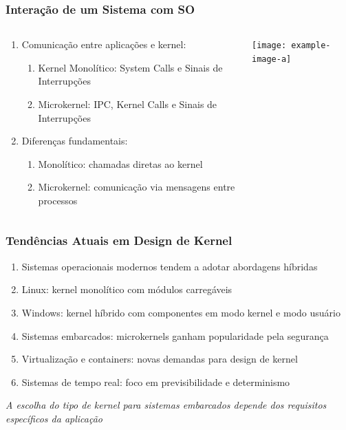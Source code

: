 \documentclass{beamer}
\begin{document}
\begin{frame}[fragile]
\frametitle{Interação de um Sistema com SO}

\begin{columns}
    \begin{column}{0.55\textwidth}
        \begin{enumerate}\small
            \item Comunicação entre aplicações e kernel:
            \begin{enumerate}\footnotesize
                \item Kernel Monolítico: System Calls e Sinais de Interrupções
                \item Microkernel: IPC, Kernel Calls e Sinais de Interrupções
            \end{enumerate}
            \item Diferenças fundamentais:
            \begin{enumerate}\footnotesize
                \item Monolítico: chamadas diretas ao kernel
                \item Microkernel: comunicação via mensagens entre processos
            \end{enumerate}
        \end{enumerate}
    \end{column}
    
    \begin{column}{0.45\textwidth}
        \begin{center}
            \texttt{[image: example-image-a]}
        \end{center}
    \end{column}
\end{columns}
\end{frame}

\begin{frame}[fragile]
\frametitle{Tendências Atuais em Design de Kernel}

\begin{enumerate}\small
    \item Sistemas operacionais modernos tendem a adotar abordagens híbridas
    \item Linux: kernel monolítico com módulos carregáveis
    \item Windows: kernel híbrido com componentes em modo kernel e modo usuário
    \item Sistemas embarcados: microkernels ganham popularidade pela segurança
    \item Virtualização e containers: novas demandas para design de kernel
    \item Sistemas de tempo real: foco em previsibilidade e determinismo
\end{enumerate}

\vfill
\begin{center}
    \textit{A escolha do tipo de kernel para sistemas embarcados depende dos requisitos específicos da aplicação \cite{stallings2018operating}}
\end{center}
\end{frame}
\end{document}
